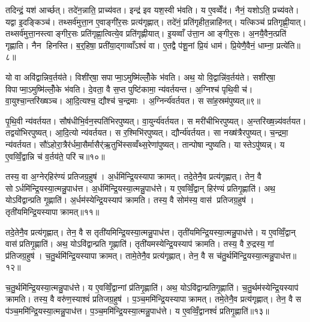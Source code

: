 तदिन्द्रं॒ यश॑ आर्च्छत्। तदे॑न॒न्नाति॒ प्राच्य॑वत। इन्द्र॑ इव यश॒स्वी भ॑वति। य ए॒वव्वेँद॑। नैनं॒ यशोऽति॒ प्रच्य॑वते। यद्वा इ॒दङ्किञ्च॑। तथ्सर्व॑मुत्ता॒न ए॒वाङ्गी॑र॒सः प्रत्य॑गृह्णात्। तदे॑नं॒ प्रति॑गृहीत॒न्नाहि॑नत्। यत्किञ्च॑ प्रतिगृह्णी॒यात्। तथ्सर्व॑मुत्ता॒नस्त्वाङ्गीर॒सः प्रति॑गृह्णा॒त्वित्ये॒व प्रति॑गृह्णीयात्। इ॒यव्वाँ उ॑त्ता॒न आङ्गीर॒सः। अ॒नयै॒वैन॒त्प्रति॑ गृह्णाति। नैन हिनस्ति। ब॒र्॒हिषा॒ प्रती॑या॒द्गाव्वाँऽश्वं॑ वा। ए॒तद्वै प॑शू॒नां प्रि॒यं धाम॑। प्रि॒येणै॒वैनं॒ धाम्ना॒ प्रत्ये॑ति॥८॥\anuvakamend[वि॒ग्राह॑मृ॒तव॒स्तदाऽल॑भ॒तेन्द्र॑ङ्गृह्णीया॒थ्षट्च॑]

यो वा अवि॑द्वान्निव॒र्तय॑ते। विशी॑र्‌षा॒ सपाप्मा॒ऽमुष्मि॑ल्लोँ॒के भ॑वति। अथ॒ यो वि॒द्वान्नि॑व॒र्तय॑ते। सशी॑र्‌षा॒ विपाप्मा॒ऽमुष्मि॑ल्लोँ॒के भ॑वति। दे॒वता॒ वै स॒प्त पुष्टि॑कामा॒ न्य॑वर्तयन्त। अ॒ग्निश्च॑ पृथि॒वी च॑। वा॒युश्चा॒न्तरि॑ख्षञ्च। आ॒दि॒त्यश्च॒ द्यौश्च॑ च॒न्द्रमाः। अ॒ग्निर्न्य॑वर्तयत। स सा॑ह॒स्रम॑पुष्यत्॥९॥

पृ॒थि॒वी न्य॑वर्तयत। सौष॑धीभि॒र्वन॒स्पति॑भिरपुष्यत्। वा॒युर्न्य॑वर्तयत। स मरी॑चीभिरपुष्यत्। अ॒न्तरि॑ख्ष॒न्न्य॑वर्तयत। तद्वयो॑भिरपुष्यत्। आ॒दि॒त्यो न्य॑वर्तयत। स र॒श्मिभि॑रपुष्यत्। द्यौर्न्य॑वर्तयत। सा नख्ष॑त्रैरपुष्यत्। च॒न्द्रमा॒ न्य॑वर्तयत। सौ॑ऽहोरा॒त्रैर॑र्धमा॒सैर्मासैर्॑ऋ॒तुभि॑स्सव्वँथ्स॒रेणा॑पुष्यत्। तान्पोषान्पुष्यति। यास्तेऽपु॑ष्यन्न्। य ए॒वव्विँ॒द्वान्नि च॑ व॒र्तय॑ते॒ परि॑ च॥१०॥\anuvakamend[अ॒पु॒ष्य॒न्नख्ष॑त्रैरपुष्य॒त्पञ्च॑ च]

तस्य॒ वा अ॒ग्नेर्‌हिर॑ण्यं प्रतिजग्र॒हुष॑। अ॒र्धमि॑न्द्रि॒यस्यापाक्रामत्। तदे॒तेनै॒व प्रत्य॑गृह्णात्। तेन॒ वै सोऽर्धमि॑न्द्रि॒यस्या॒त्मन्नु॒पाध॑त्त। अ॒र्धमि॑न्द्रि॒यस्या॒त्मन्नु॒पाध॑त्ते। य ए॒वव्विँ॒द्वान् हिर॑ण्यं प्रतिगृ॒ह्णाति॑। अथ॒ योऽवि॑द्वान्प्रति गृ॒ह्णाति॑। अ॒र्धम॑स्येन्द्रि॒यस्याप॑ क्रामति। तस्य॒ वै सोम॑स्य॒ वास॑ प्रतिजग्र॒हुष॑। तृती॑यमिन्द्रि॒यस्यापाक्रामत्॥११॥

तदे॒तेनै॒व प्रत्य॑गृह्णात्। तेन॒ वै स तृती॑यमिन्द्रि॒यस्या॒त्मन्नु॒पाध॑त्त। तृती॑यमिन्द्रि॒यस्या॒त्मन्नु॒पाध॑त्ते। य ए॒वव्विँ॒द्वान् वास॑प्रतिगृ॒ह्णाति॑। अथ॒ योऽवि॑द्वान्प्रति गृ॒ह्णाति॑। तृती॑यमस्येन्द्रि॒यस्याप॑ क्रामति। तस्य॒ वै रु॒द्रस्य॒ गां प्र॑तिजग्र॒हुष॑। च॒तु॒र्थमि॑न्द्रि॒यस्यापाक्रामत्। तामे॒तेनै॒व प्रत्य॑गृह्णात्। तेन॒ वै स च॑तु॒र्थमि॑न्द्रि॒यस्या॒त्मन्नु॒पाध॑त्त॥१२॥

च॒तु॒र्थमि॑न्द्रि॒यस्या॒त्मन्नु॒पाध॑त्ते। य ए॒वव्विँ॒द्वान्गां प्र॑तिगृ॒ह्णाति॑। अथ॒ योऽवि॑द्वान्प्रतिगृ॒ह्णाति॑। च॒तु॒र्थम॑स्येन्द्रि॒यस्याप॑ क्रामति। तस्य॒ वै वरु॑ण॒स्याश्वं॑ प्रतिजग्र॒हुष॑। प॒ञ्च॒ममि॑न्द्रि॒यस्यापाक्रामत्। तमे॒तेनै॒व प्रत्य॑गृह्णात्। तेन॒ वै स प॑ञ्च॒ममि॑न्द्रि॒यस्या॒त्मन्नु॒पाध॑त्त। प॒ञ्च॒ममि॑न्द्रि॒यस्या॒त्मन्नु॒पाध॑त्ते। य ए॒वव्विँ॒द्वानश्वं॑ प्रतिगृ॒ह्णाति॑॥१३॥


